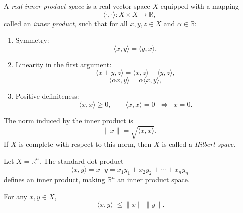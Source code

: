 \begin{definition}
A \emph{real inner product space} is a real vector space $X$ equipped with a mapping
\begin{equation}
    \langle \cdot, \cdot \rangle : X \times X \to \mathbb{R},
\end{equation}
called an \emph{inner product}, such that for all $x,y,z \in X$ and $\alpha \in \mathbb{R}$:
\begin{enumerate}
    \item Symmetry:
    \begin{equation}
        \langle x, y \rangle = \langle y, x \rangle,
    \end{equation}
    \item Linearity in the first argument:
    \begin{equation}
        \langle x+y, z \rangle = \langle x,z \rangle + \langle y,z \rangle,
    \end{equation}
    \begin{equation}
        \langle \alpha x, y \rangle = \alpha \langle x,y \rangle,
    \end{equation}
    \item Positive-definiteness:
    \begin{equation}
        \langle x,x \rangle \ge 0, 
        \qquad \langle x,x \rangle = 0 \;\; \Leftrightarrow \;\; x=0.
    \end{equation}
\end{enumerate}
The norm induced by the inner product is
\begin{equation}
    \|x\| = \sqrt{\langle x,x \rangle}.
\end{equation}
If $X$ is complete with respect to this norm, then $X$ is called a \emph{Hilbert space}.
\end{definition}

\begin{example}
Let $X = \mathbb{R}^n$. The standard dot product
\begin{equation}
    \langle x,y \rangle = x^\top y = x_1 y_1 + x_2 y_2 + \cdots + x_n y_n
\end{equation}
defines an inner product, making $\mathbb{R}^n$ an inner product space.
\end{example}

\begin{remark}
For any $x,y \in X$,
\begin{equation}
    |\langle x, y \rangle| \le \|x\|\, \|y\|.
\end{equation}
\end{remark}

